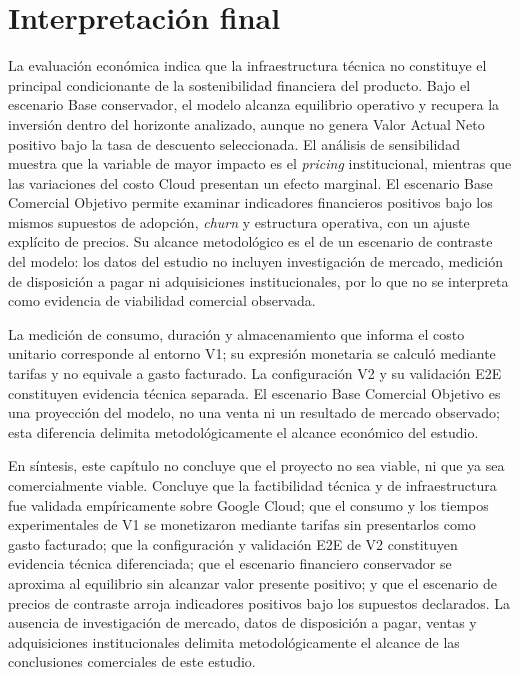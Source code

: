 \section{Interpretación final}
\label{sec:mn-interpretacion}

La evaluación económica indica que la infraestructura técnica no constituye el principal condicionante de la sostenibilidad financiera del producto. Bajo el escenario Base conservador, el modelo alcanza equilibrio operativo y recupera la inversión dentro del horizonte analizado, aunque no genera Valor Actual Neto positivo bajo la tasa de descuento seleccionada. El análisis de sensibilidad muestra que la variable de mayor impacto es el \textit{pricing} institucional, mientras que las variaciones del costo Cloud presentan un efecto marginal. El escenario Base Comercial Objetivo permite examinar indicadores financieros positivos bajo los mismos supuestos de adopción, \textit{churn} y estructura operativa, con un ajuste explícito de precios. Su alcance metodológico es el de un escenario de contraste del modelo: los datos del estudio no incluyen investigación de mercado, medición de disposición a pagar ni adquisiciones institucionales, por lo que no se interpreta como evidencia de viabilidad comercial observada.

La medición de consumo, duración y almacenamiento que informa el costo unitario corresponde al entorno V1; su expresión monetaria se calculó mediante tarifas y no equivale a gasto facturado. La configuración V2 y su validación E2E constituyen evidencia técnica separada. El escenario Base Comercial Objetivo es una proyección del modelo, no una venta ni un resultado de mercado observado; esta diferencia delimita metodológicamente el alcance económico del estudio.

En síntesis, este capítulo no concluye que el proyecto no sea viable, ni que ya sea comercialmente viable. Concluye que la factibilidad técnica y de infraestructura fue validada empíricamente sobre Google Cloud; que el consumo y los tiempos experimentales de V1 se monetizaron mediante tarifas sin presentarlos como gasto facturado; que la configuración y validación E2E de V2 constituyen evidencia técnica diferenciada; que el escenario financiero conservador se aproxima al equilibrio sin alcanzar valor presente positivo; y que el escenario de precios de contraste arroja indicadores positivos bajo los supuestos declarados. La ausencia de investigación de mercado, datos de disposición a pagar, ventas y adquisiciones institucionales delimita metodológicamente el alcance de las conclusiones comerciales de este estudio.
